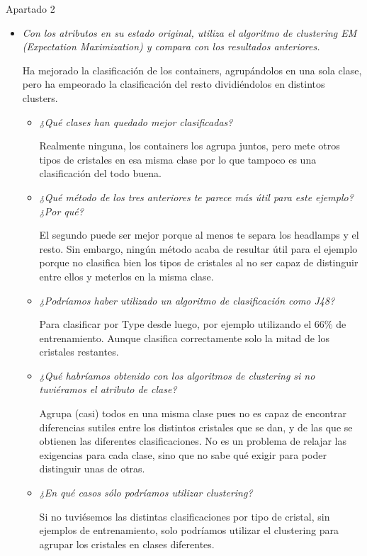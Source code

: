 \documentclass[11pt, a4paper, spanish, openright, twoside]{book}
\begin{document}
\begin{section}{Apartado 2}
\begin{itemize}
	\item \textit{Con los atributos en su estado original, utiliza el algoritmo de clustering EM (Expectation 
	Maximization) y compara con los resultados anteriores.}
	
	Ha mejorado la clasificación de los containers, agrupándolos en una sola clase, pero ha empeorado la clasificación del resto dividiéndolos en distintos clusters.

	\begin{itemize}
	\item \textit{¿Qué clases han quedado mejor clasificadas?}
	
	Realmente ninguna, los containers los agrupa juntos, pero mete otros tipos de cristales en esa misma clase por lo que tampoco es una clasificación del todo buena.

	\item \textit{¿Qué método de los tres anteriores te parece más útil para este ejemplo? ¿Por qué? }

	El segundo puede ser mejor porque al menos te separa los headlamps y el resto. Sin embargo, ningún método acaba de resultar útil para el ejemplo porque 
	no clasifica bien los tipos de cristales al no ser capaz de distinguir entre ellos y meterlos en la misma clase.

	\item \textit{¿Podríamos haber utilizado un algoritmo de clasificación como J48? }

	Para clasificar por Type desde luego,  por ejemplo utilizando el 66\% de entrenamiento. Aunque clasifica correctamente solo la mitad de los cristales restantes.

	\item \textit{¿Qué habríamos obtenido con los algoritmos de clustering si no tuviéramos el atributo de clase?}

	Agrupa (casi) todos en una misma clase pues no es capaz de encontrar diferencias sutiles entre los distintos cristales que se dan, y de las que se obtienen las diferentes clasificaciones. 
	No es un problema de relajar las exigencias para cada clase, sino que no sabe qué exigir para poder distinguir unas de otras.

	 \item \textit{¿En qué casos sólo podríamos utilizar clustering?}
	
	Si no tuviésemos las distintas clasificaciones por tipo de cristal, sin ejemplos de entrenamiento, solo podríamos utilizar el clustering para agrupar los cristales en clases diferentes.
	\end{itemize}
	\end{itemize}
\end{section}
\end{document}
